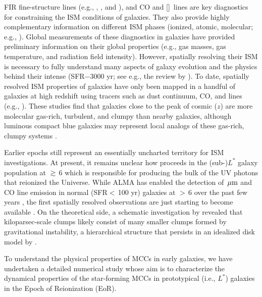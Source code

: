 \IfFileExists{emulateapjlegacy.cls}{\documentclass[iop]{emulateapjlegacy}}{\documentclass[iop]{emulateapj}}
\begin{document}
FIR fine-structure lines (e.g., \cii, \nii, and \oiii), and CO and [\ci]~lines are key diagnostics for constraining the ISM conditions of galaxies. They also provide highly complementary information on different ISM phases (ionized, atomic, molecular; e.g., \citealt{Scoville74a, Rubin85a, Malhotra01a}).
%
Global measurements of these diagnostics in \highz galaxies have provided preliminary information on their global properties (e.g., gas masses, gas temperature, and radiation field intensity). However, spatially resolving their ISM is necessary to fully understand many aspects of galaxy evolution and the physics behind their intense \SF (SFR$-$3000\,\Msun\,yr\pmOne; see e.g., the review by \citealt{CW13}).
%
To date, spatially resolved ISM properties of \highz galaxies have only been mapped in a handful of galaxies at high redshift using tracers such as dust continuum, CO, and \cii lines (e.g., \citealt{Swinbank11a, Hodge15a, Ferkinhoff15a, Hodge16a, Leung19a}). These studies find that galaxies close to the peak of cosmic \SF ($z$) are more molecular gas-rich, turbulent, and clumpy than nearby galaxies, although luminous compact blue galaxies may represent local analogs of these gas-rich, clumpy systems \citep{Garland15}.

Earlier epochs still represent an essentially uncharted territory for ISM investigations. At present, it remains unclear how \SF proceeds in the (sub-)$L^*$ galaxy population at \z$\gtrsim$\,6  which is responsible for producing the bulk of the UV photons that reionized the Universe.
%
While ALMA has enabled the detection of \,$\mbox{$\mu$m}$ and CO line emission in normal (SFR$<$\,100\,\Msun\,yr\pmOne) galaxies at \z$>$\,6 over the past few years \citep[e.g.,][]{Carniani18b, Odorico18a}, the first spatially resolved observations are just starting to become available \citep[e.g., ][]{Jones17a}.
%
On the theoretical side, a schematic investigation by \citet{Behrendt16} revealed that kiloparsec-scale clumps likely consist of many smaller clumps formed by gravitational instability, a hierarchical structure that persists in an idealized disk model by \citet{Behrendt19}.

To understand the physical properties of MCCs in early galaxies, we have undertaken a detailed numerical study whose aim is to characterize the dynamical properties of the star-forming MCCs in prototypical (i.e., $L^*$) galaxies in the Epoch of Reionization (EoR).
\end{document}
